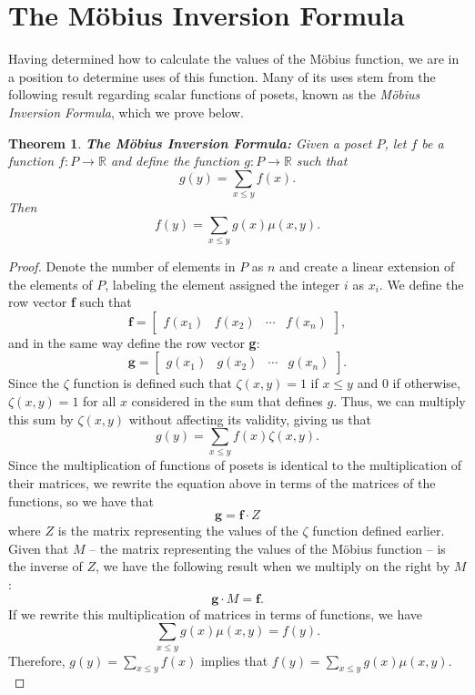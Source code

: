 \documentclass{article} %
\theoremstyle{definition}
\theoremstyle{plain}
\newtheorem{thm}{Theorem}[section]
\begin{document}
\section{The M\"{o}bius Inversion Formula} %
Having determined how to calculate the values of the M\"{o}bius function, we are in a position to determine uses of this function. Many of its uses stem from the following result regarding scalar functions of posets, known as the \textit{M\"{o}bius Inversion Formula}, which we prove below.
\begin{thm}
\textbf{The M\"{o}bius Inversion Formula:} Given a poset $P$,
let $f$ be a function $f:P\rightarrow \mathbb{R}$ and define the function $g:P\rightarrow \mathbb{R}$ such that
$$g(y)=\sum_{x\le y}f(x).$$
Then
$$f(y)=\sum_{x\le y}g(x)\mu(x,y).$$
\end{thm}
\begin{proof} Denote the number of elements in $P$ as $n$ and create a linear extension of the elements of $P$, labeling the element assigned the integer $i$ as $x_i$. We define the row vector \textbf{f} such that
$$\textbf{f}=\begin{bmatrix}
f(x_1) & f(x_2) & \cdots & f(x_n)
\end{bmatrix},$$
and in the same way define the row vector \textbf{g}:
$$\textbf{g}=\begin{bmatrix}
g(x_1) & g(x_2) & \cdots & g(x_n)
\end{bmatrix}.$$
Since the $\zeta$ function is defined such that $\zeta(x,y)=1$ if $x\le y$ and 0 if otherwise, $\zeta(x,y)=1$ for all $x$ considered in the sum that defines $g$. Thus, we can multiply this sum by $\zeta(x,y)$ without affecting its validity, giving us that
$$g(y)=\sum_{x\le y}f(x)\zeta(x,y).$$
Since the multiplication of functions of posets is identical to the multiplication of their matrices, we rewrite the equation above in terms of the matrices of the functions, so we have that
$$\textbf{g}=\textbf{f}\cdot Z$$ 
where $Z$ is the matrix representing the values of the $\zeta$ function defined earlier. Given that $M$ -- the matrix representing the values of the M\"{o}bius function -- is the inverse of $Z$, we have the following result when we multiply on the right by $M$:
$$\textbf{g}\cdot M=\textbf{f}.$$
If we rewrite this multiplication of matrices in terms of functions, we have
$$\sum_{x\le y}g(x)\mu(x,y)=f(y).$$
Therefore, $g(y)=\sum_{x \le y}f(x)$ implies that $f(y)=\sum_{x \le y}g(x)\mu(x,y).$
\end{proof}
\end{document}
